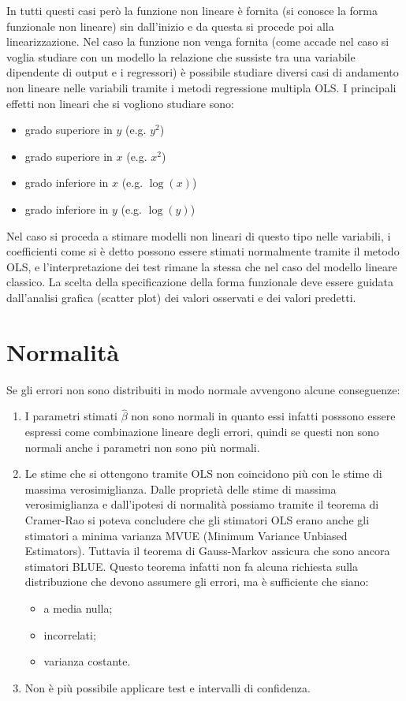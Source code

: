 In tutti questi casi però la funzione non lineare è fornita (si conosce la forma funzionale non lineare) sin dall'inizio e da questa si procede poi alla linearizzazione. Nel caso la funzione non venga fornita (come accade nel caso si voglia studiare con un modello la relazione che sussiste tra una variabile dipendente di output e i regressori) è possibile studiare diversi casi di andamento non lineare nelle variabili tramite i metodi regressione multipla OLS. I principali effetti non lineari che si vogliono studiare sono:
\begin{itemize}
	\item grado superiore in $y$ (e.g. $y^2$)
	\item grado superiore in $x$ (e.g. $x^2$)
	\item grado inferiore in $x$ (e.g. $\log(x)$)
	\item grado inferiore in $y$ (e.g. $\log(y)$)
\end{itemize}
Nel caso si proceda a stimare modelli non lineari di questo tipo nelle variabili, i coefficienti come si è detto possono essere stimati normalmente tramite il metodo OLS, e l'interpretazione dei test rimane la stessa che nel caso del modello lineare classico. La scelta della specificazione della forma funzionale deve essere guidata dall'analisi grafica (scatter plot) dei valori osservati e dei valori predetti.

\section{Normalità}
Se gli errori non sono distribuiti in modo normale avvengono alcune conseguenze:

\begin{enumerate}
	\item I parametri stimati $\hat{\beta}$ non sono normali in quanto essi infatti posssono essere espressi come combinazione lineare degli errori, quindi se questi non sono normali anche i parametri non sono più normali.
	\item Le stime che si ottengono tramite OLS non coincidono più con le stime di massima verosimiglianza. Dalle proprietà delle stime di massima verosimiglianza e dall'ipotesi di normalità possiamo tramite il teorema di Cramer-Rao si poteva concludere che gli stimatori OLS erano anche gli stimatori a minima varianza MVUE (Minimum Variance Unbiased Estimators). Tuttavia il teorema di Gauss-Markov assicura che sono ancora stimatori BLUE. Questo teorema infatti non fa alcuna richiesta sulla distribuzione che devono assumere gli errori, ma è sufficiente che siano:
	\begin{itemize}
		\item a media nulla;
		\item incorrelati;
		\item varianza costante.
	\end{itemize}
	\item Non è più possibile applicare test e intervalli di confidenza.
\end{enumerate}


